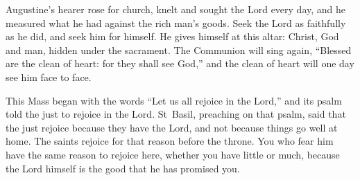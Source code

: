 Augustine's hearer rose for church, knelt and sought the Lord every day, and
he measured what he had against the rich man's goods. Seek the Lord as
faithfully as he did, and seek him for himself. He gives himself at this
altar: Christ, God and man, hidden under the sacrament. The Communion will
sing again, ``Blessed are the clean of heart: for they shall see God,'' and
the clean of heart will one day see him face to face.

This Mass began with the words ``Let us all rejoice in the Lord,'' and its
psalm told the just to rejoice in the Lord. St~Basil, preaching on that
psalm, said that the just rejoice because they have the Lord, and not because
things go well at home. The saints rejoice for that reason before the throne.
You who fear him have the same reason to rejoice here, whether you have
little or much, because the Lord himself is the good that he has promised you.

